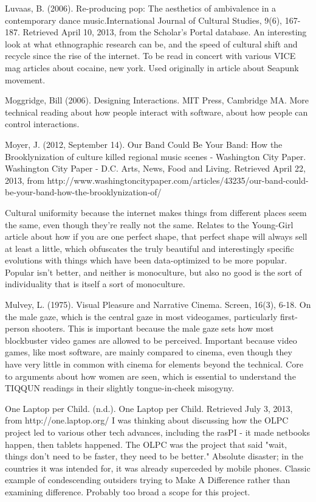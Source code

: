 Luvaas, B. (2006). Re-producing pop: The aesthetics of ambivalence in a contemporary dance music.International Journal of Cultural Studies, 9(6), 167-187. Retrieved April 10, 2013, from the 
	Scholar's Portal database.
	An interesting look at what ethnographic research can be, and the speed of cultural shift and recycle since the rise of the internet. To be read in concert with various VICE mag articles about cocaine, new york. Used originally in article about Seapunk movement.

Moggridge, Bill (2006). Designing Interactions. MIT Press, Cambridge MA.
	More technical reading about how people interact with software, about how people can control interactions.

Moyer, J. (2012, September 14). Our Band Could Be Your Band: How the Brooklynization of culture killed 
	regional music scenes - Washington City Paper. Washington City Paper - D.C. Arts, News, Food and 	
	Living. Retrieved April 22, 2013, from 
	http://www.washingtoncitypaper.com/articles/43235/our-band-could-be-your-band-how-the-brooklynization-of/

	Cultural uniformity because the internet makes things from different places seem the same, even though they're really not the same. Relates to the Young-Girl article about how if you are one perfect shape, that perfect shape will always sell at least a little, which obfuscates the truly beautiful and interestingly specific evolutions with things which have been data-optimized to be more popular. Popular isn't better, and neither is monoculture, but also no good is the sort of individuality that is itself a sort of monoculture.

Mulvey, L. (1975). Visual Pleasure and Narrative Cinema. Screen, 16(3), 6-18.
	On the male gaze, which is the central gaze in most videogames, particularly first-person shooters.	This is important because the male gaze sets how most blockbuster video games are allowed to be perceived. Important because video games, like most software, are mainly compared to cinema, even though they have very little in common with cinema for elements beyond the technical. Core to arguments about how women are seen, which is essential to understand the TIQQUN readings in their slightly tongue-in-cheek misogyny.

One Laptop per Child. (n.d.). One Laptop per Child. Retrieved July 3, 2013, from http://one.laptop.org/
	I was thinking about discussing how the OLPC project led to various other tech advances, including the rasPI - it made netbooks happen, then tablets happened. The OLPC was the project that said "wait, things don't need to be faster, they need to be better." Absolute disaster; in the countries it was intended for, it was already superceded by mobile phones. Classic example of condescending outsiders trying to Make A Difference rather than examining difference. Probably too broad a scope for this project.

